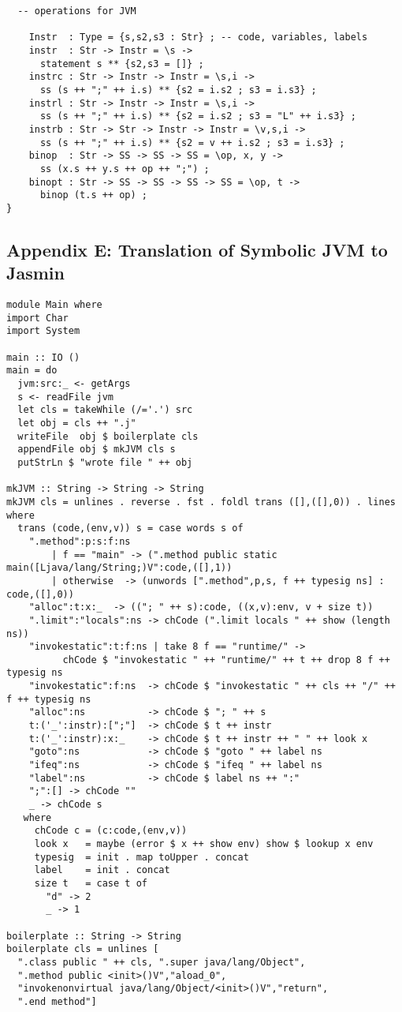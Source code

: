 \documentclass[12pt]{article}
\begin{document}
\begin{verbatim}
  -- operations for JVM

    Instr  : Type = {s,s2,s3 : Str} ; -- code, variables, labels
    instr  : Str -> Instr = \s -> 
      statement s ** {s2,s3 = []} ;
    instrc : Str -> Instr -> Instr = \s,i -> 
      ss (s ++ ";" ++ i.s) ** {s2 = i.s2 ; s3 = i.s3} ;
    instrl : Str -> Instr -> Instr = \s,i -> 
      ss (s ++ ";" ++ i.s) ** {s2 = i.s2 ; s3 = "L" ++ i.s3} ;
    instrb : Str -> Str -> Instr -> Instr = \v,s,i -> 
      ss (s ++ ";" ++ i.s) ** {s2 = v ++ i.s2 ; s3 = i.s3} ;
    binop  : Str -> SS -> SS -> SS = \op, x, y ->
      ss (x.s ++ y.s ++ op ++ ";") ;
    binopt : Str -> SS -> SS -> SS -> SS = \op, t ->
      binop (t.s ++ op) ;
}
\end{verbatim}
\normalsize
\newpage


\subsection*{Appendix E: Translation of Symbolic JVM to Jasmin}

\small
\begin{verbatim}
module Main where
import Char
import System

main :: IO ()
main = do
  jvm:src:_ <- getArgs
  s <- readFile jvm
  let cls = takeWhile (/='.') src
  let obj = cls ++ ".j"
  writeFile  obj $ boilerplate cls
  appendFile obj $ mkJVM cls s
  putStrLn $ "wrote file " ++ obj

mkJVM :: String -> String -> String
mkJVM cls = unlines . reverse . fst . foldl trans ([],([],0)) . lines where
  trans (code,(env,v)) s = case words s of
    ".method":p:s:f:ns
        | f == "main" -> (".method public static main([Ljava/lang/String;)V":code,([],1))
        | otherwise  -> (unwords [".method",p,s, f ++ typesig ns] : code,([],0))
    "alloc":t:x:_  -> (("; " ++ s):code, ((x,v):env, v + size t))
    ".limit":"locals":ns -> chCode (".limit locals " ++ show (length ns))
    "invokestatic":t:f:ns | take 8 f == "runtime/" -> 
          chCode $ "invokestatic " ++ "runtime/" ++ t ++ drop 8 f ++ typesig ns 
    "invokestatic":f:ns  -> chCode $ "invokestatic " ++ cls ++ "/" ++ f ++ typesig ns 
    "alloc":ns           -> chCode $ "; " ++ s
    t:('_':instr):[";"]  -> chCode $ t ++ instr
    t:('_':instr):x:_    -> chCode $ t ++ instr ++ " " ++ look x
    "goto":ns            -> chCode $ "goto " ++ label ns
    "ifeq":ns            -> chCode $ "ifeq " ++ label ns
    "label":ns           -> chCode $ label ns ++ ":"
    ";":[] -> chCode ""
    _ -> chCode s
   where
     chCode c = (c:code,(env,v))
     look x   = maybe (error $ x ++ show env) show $ lookup x env
     typesig  = init . map toUpper . concat
     label    = init . concat
     size t   = case t of
       "d" -> 2
       _ -> 1

boilerplate :: String -> String
boilerplate cls = unlines [
  ".class public " ++ cls, ".super java/lang/Object",
  ".method public <init>()V","aload_0",
  "invokenonvirtual java/lang/Object/<init>()V","return",
  ".end method"]
\end{verbatim}
\normalsize
\newpage
\end{document}
